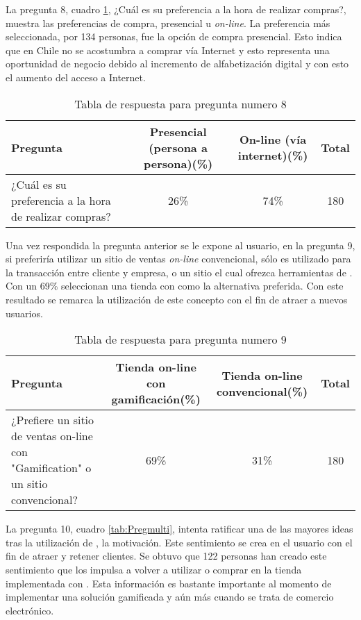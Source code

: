 La pregunta 8, cuadro \ref{tab:Preg8},
¿Cuál es su preferencia a la hora de realizar compras?,
muestra las preferencias  de compra, presencial u \emph{on-line}.
La preferencia más seleccionada, por 134 personas, fue la opción de compra
presencial.
Esto indica que en Chile no se acostumbra a comprar vía Internet y esto representa
una oportunidad de negocio debido al incremento de alfabetización digital y
con esto el aumento del acceso a Internet.

\begin{table}[h]
\centering
\footnotesize
\begin{tabular}{|p{6cm}|c|c|c|}
\hline
{\bf Pregunta} & {\bf Presencial (persona a persona)(\%)} & {\bf On-line (vía internet)(\%)} & {\bf Total}\\
\hline
¿Cuál es su preferencia a la hora de realizar compras?& 26\% & 74\% & 180 \\
\hline
\end{tabular}
\caption{Tabla de respuesta para pregunta numero 8}
\label{tab:Preg8}
\end{table}


Una vez respondida la pregunta anterior se le expone al usuario, en la pregunta 9,
si preferiría utilizar un sitio de ventas \emph{on-line} convencional, sólo es utilizado
para la transacción entre cliente y empresa, o un sitio el cual ofrezca
herramientas de {\gam}.
Con un 69\% seleccionan una tienda con {\gam} como la alternativa preferida.
Con este resultado se remarca la utilización de este concepto con el fin de atraer
a nuevos usuarios.

\begin{table}[h]
\centering
\footnotesize
\begin{tabular}{|p{6cm}|c|c|c|}
\hline
Pregunta & Tienda on-line con gamificación(\%) & Tienda on-line convencional(\%) & Total\\
\hline
¿Prefiere un sitio de ventas on-line con "Gamification" o un sitio convencional?& 69\% & 31\% & 180 \\
\hline
\end{tabular}
\caption{Tabla de respuesta para pregunta numero 9}
\label{tab:Preg9}
\end{table}


La pregunta 10, cuadro \ref{tab:Pregmulti}, intenta ratificar una de las mayores ideas tras la utilización
de {\gam}, la motivación.
Este sentimiento se crea en el usuario con el fin de atraer y retener clientes.
Se obtuvo que 122 personas han creado este sentimiento que los impulsa a volver
a utilizar o comprar en la tienda implementada con {\gam}.
Esta información es bastante importante al momento de implementar una solución
gamificada y aún más cuando se trata de comercio electrónico.

